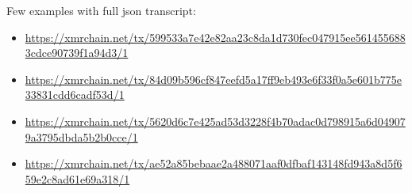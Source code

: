 \documentclass[]{article}
\begin{document}

Few examples with full json transcript:
\begin{itemize}
	\item \footnotesize\url{https://xmrchain.net/tx/599533a7e42e82aa23c8da1d730fec047915ee5614556883cdce90739f1a94d3/1}
	
	\item \footnotesize\url{https://xmrchain.net/tx/84d09b596cf847eefd5a17ff9eb493e6f33f0a5e601b775e33831cdd6cadf53d/1}
	
	\item \footnotesize\url{https://xmrchain.net/tx/5620d6c7e425ad53d3228f4b70adac0d798915a6d049079a3795dbda5b2b0cce/1}
	
	\item \footnotesize\url{https://xmrchain.net/tx/ae52a85bebaae2a488071aaf0dfbaf143148fd943a8d5f659e2c8ad61e69a318/1}
\end{itemize}

{}

	
\end{document}
